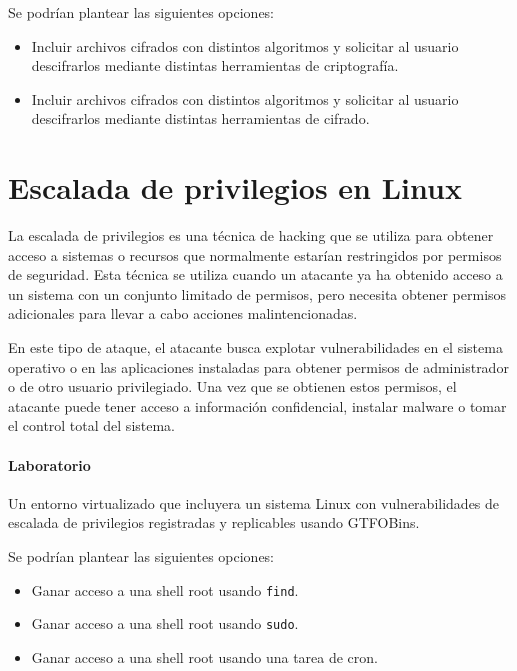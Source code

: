                Se podrían plantear las siguientes opciones:
                
                \begin{itemize}
                    \item Incluir archivos cifrados con distintos algoritmos y solicitar al usuario descifrarlos mediante distintas herramientas de criptografía.
                    \item Incluir archivos cifrados con distintos algoritmos y solicitar al usuario descifrarlos mediante distintas herramientas de cifrado.
                \end{itemize}

    
    \section{Escalada de privilegios en Linux}

        La escalada de privilegios es una técnica de hacking que se utiliza para obtener acceso a sistemas o recursos que normalmente estarían restringidos por permisos de seguridad. Esta técnica se utiliza cuando un atacante ya ha obtenido acceso a un sistema con un conjunto limitado de permisos, pero necesita obtener permisos adicionales para llevar a cabo acciones malintencionadas.
            
        En este tipo de ataque, el atacante busca explotar vulnerabilidades en el sistema operativo o en las aplicaciones instaladas para obtener permisos de administrador o de otro usuario privilegiado. Una vez que se obtienen estos permisos, el atacante puede tener acceso a información confidencial, instalar malware o tomar el control total del sistema.

        \paragraph{Laboratorio}

            Un entorno virtualizado que incluyera un sistema Linux con vulnerabilidades de escalada de privilegios registradas y replicables usando GTFOBins.

            Se podrían plantear las siguientes opciones:
            
            \begin{itemize}
                \item Ganar acceso a una shell root usando \texttt{find}.
                \item Ganar acceso a una shell root usando \texttt{sudo}.
                \item Ganar acceso a una shell root usando una tarea de cron.
            \end{itemize}

